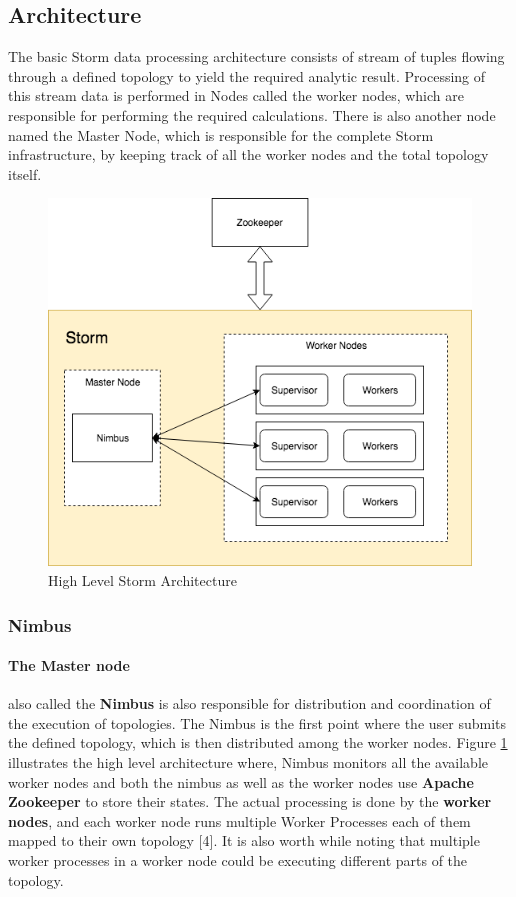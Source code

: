 \documentclass[runningheads,a4paper]{llncs}[2015/06/24]
\begin{document}
\subsection{Architecture}
The basic Storm data processing architecture consists of stream of tuples flowing through a defined topology to yield the required analytic result. Processing of this stream data is performed in Nodes called the worker nodes, which are responsible for performing the required calculations. There is also another node named the Master Node, which is responsible for the complete Storm infrastructure,  by keeping track of all the worker nodes and the total topology itself.

\begin{figure}
  \begin{center}
    \includegraphics[width=.5\textwidth]{arch.png}
    \caption{High Level Storm Architecture}
    \label{fig:arch}
   \end{center}
\end{figure}

\subsubsection{Nimbus}

\paragraph{The Master node} also called the \textbf{Nimbus} is also responsible for distribution and coordination of the execution of topologies. The Nimbus is the first point where the user submits the defined topology, which is then distributed among the worker nodes.  Figure \ref{fig:arch} illustrates the high level architecture where, Nimbus monitors all the available worker nodes and both the nimbus as well as the worker nodes use \textbf{Apache Zookeeper} to store their states. The actual processing is done by the \textbf{worker nodes}, and each worker node runs multiple Worker Processes each of them mapped to their own topology [4]. It is also worth while noting that multiple worker processes in a worker node could be executing different parts of the topology.
\end{document}
